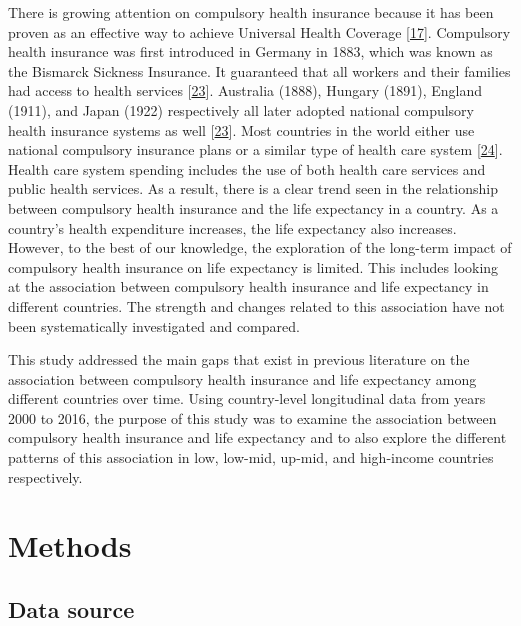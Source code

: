 \documentclass[]{elsarticle} %
\begin{document}
There is growing attention on compulsory health insurance because it has been proven as an effective way to achieve Universal Health Coverage {[}\protect\hyperlink{ref-wagstaff2018progress}{17}{]}.
Compulsory health insurance was first introduced in Germany in 1883, which was known as the Bismarck Sickness Insurance.
It guaranteed that all workers and their families had access to health services {[}\protect\hyperlink{ref-walker1969compulsory}{23}{]}.
Australia (1888), Hungary (1891), England (1911), and Japan (1922) respectively all later adopted national compulsory health insurance systems as well {[}\protect\hyperlink{ref-walker1969compulsory}{23}{]}.
Most countries in the world either use national compulsory insurance plans or a similar type of health care system {[}\protect\hyperlink{ref-healthglance2017}{24}{]}.
Health care system spending includes the use of both health care services and public health services.
As a result, there is a clear trend seen in the relationship between compulsory health insurance and the life expectancy in a country.
As a country's health expenditure increases, the life expectancy also increases.
However, to the best of our knowledge, the exploration of the long-term impact of compulsory health insurance on life expectancy is limited.
This includes looking at the association between compulsory health insurance and life expectancy in different countries.
The strength and changes related to this association have not been systematically investigated and compared.

This study addressed the main gaps that exist in previous literature on the association between compulsory health insurance and life expectancy among different countries over time. Using country-level longitudinal data from years 2000 to 2016, the purpose of this study was to examine the association between compulsory health insurance and life expectancy and to also explore the different patterns of this association in low, low-mid, up-mid, and high-income countries respectively.

\hypertarget{methods}{%
\section{Methods}\label{methods}}

\hypertarget{data-source}{%
\subsection{Data source}\label{data-source}}
\end{document}

